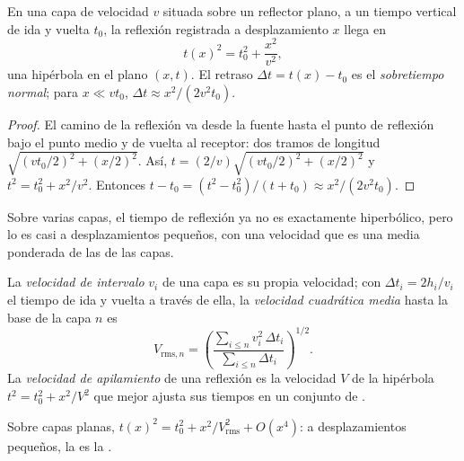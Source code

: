 \begin{theorem}\label{thm:b3:exploration-seismology:nmo}
En una capa de velocidad $v$ situada sobre un reflector plano, a un tiempo vertical de ida
y vuelta $t_0$, la reflexión registrada a desplazamiento $x$ llega en
\[
  t(x)^2 = t_0^2 + \frac{x^2}{v^2},
\]
una hipérbola en el plano $(x, t)$. El retraso $\Delta t = t(x) - t_0$ es el
\emph{sobretiempo normal}; para $x \ll vt_0$,
$\Delta t \approx x^2/(2v^2t_0)$.
\end{theorem}

\begin{proof}
El camino de la reflexión va desde la fuente hasta el punto de reflexión bajo el
punto medio y de vuelta al receptor: dos tramos de longitud
$\sqrt{(vt_0/2)^2 + (x/2)^2}$. Así, $t = (2/v)\sqrt{(vt_0/2)^2 + (x/2)^2}$ y
$t^2 = t_0^2 + x^2/v^2$. Entonces $t - t_0 = (t^2 - t_0^2)/(t + t_0) \approx
x^2/(2v^2t_0)$.
\end{proof}

Sobre varias capas, el tiempo de reflexión ya no es exactamente hiperbólico, pero lo es
casi a desplazamientos pequeños, con una velocidad que es una media ponderada de las
de las capas.

\begin{definition}\label{def:b3:exploration-seismology:velocities}
La \emph{velocidad de intervalo} $v_i$ de una capa es su
propia velocidad; con $\Delta t_i = 2h_i/v_i$ el tiempo de ida y vuelta a través de ella, la
\emph{velocidad cuadrática media} hasta la
base de la capa $n$ es
\[
  V_{\text{rms},n} = \left(\frac{\sum_{i\le n}v_i^2\,\Delta t_i}{\sum_{i\le n}\Delta t_i}\right)^{1/2}.
\]
La \emph{velocidad de apilamiento} de una reflexión es la
velocidad $V$ de la hipérbola $t^2 = t_0^2 + x^2/V^2$ que mejor ajusta sus tiempos en un
conjunto de .
\end{definition}

\begin{proposition}\label{prop:b3:exploration-seismology:rms}
Sobre capas planas, $t(x)^2 = t_0^2 + x^2/V_{\text{rms}}^2 + O(x^4)$: a desplazamientos
pequeños, la  es la .
\end{proposition}

